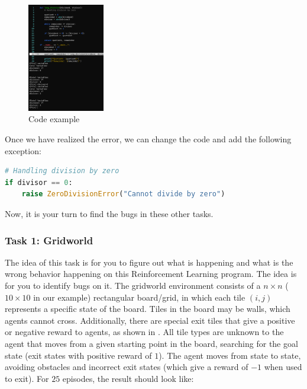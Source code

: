 \begin{figure}[h]
    \centering
    \includegraphics[width=0.3\textwidth]{figures/code_changes.png}
    \caption{Code example}
    \label{fig:code-example}
\end{figure}

Once we have realized the error, we can change the code and add the following exception:

\begin{lstlisting}[language=Python]
# Handling division by zero
if divisor == 0:
    raise ZeroDivisionError("Cannot divide by zero")
\end{lstlisting}

Now, it is your turn to find the bugs in these other tasks.

\subsubsection{Task 1: Gridworld}

The idea of this task is for you to figure out what is happening and what is the wrong behavior happening 
on this Reinforcement Learning program. The idea is for you to identify bugs on it. The gridworld 
environment consists of a $n\times n$ ($10\times 10$ in our example) rectangular board/grid, in which each tile $(i,j)$ 
represents a specific state of the board. Tiles in the board may be walls, which agents cannot cross. 
Additionally, there are special exit tiles that give a positive or negative reward to agents, as shown in 
. All tile types are unknown to the agent that moves from a given starting point in 
the board, searching for the goal state (\ie exit states with positive reward of $1$). The agent 
moves from state to state, avoiding obstacles and incorrect exit states (which give a reward of $-1$ 
when used to exit). For $25$ episodes, the result should look like:

